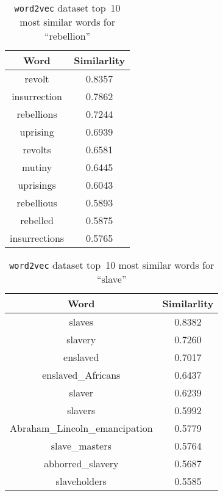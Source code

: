 \begin{table}[h]
  \centering
  \caption{\texttt{word2vec} dataset top~10 most similar words for ``rebellion''}\label{tab:P03:Word2Vec:Rebellion}
  \begin{tabular}{|c|c|}
    \hline
    \textbf{Word} & \textbf{Similarlity} \\\hline\hline
    revolt        & 0.8357 \\\hline
    insurrection  & 0.7862 \\\hline
    rebellions    & 0.7244 \\\hline
    uprising      & 0.6939 \\\hline
    revolts       & 0.6581 \\\hline
    mutiny        & 0.6445 \\\hline
    uprisings     & 0.6043 \\\hline
    rebellious    & 0.5893 \\\hline
    rebelled      & 0.5875 \\\hline
    insurrections & 0.5765 \\\hline
  \end{tabular}
\end{table}

\begin{table}[h]
  \centering
  \caption{\texttt{word2vec} dataset top~10 most similar words for ``slave''}\label{tab:P03:Word2Vec:Slave}
  \begin{tabular}{|c|c|}
    \hline
    \textbf{Word} & \textbf{Similarlity} \\\hline\hline
    slaves            & 0.8382 \\\hline
    slavery           & 0.7260 \\\hline
    enslaved          & 0.7017 \\\hline
    enslaved\_Africans  & 0.6437 \\\hline
    slaver            & 0.6239 \\\hline
    slavers           & 0.5992 \\\hline
    Abraham\_Lincoln\_emancipation & 0.5779 \\\hline
    slave\_masters    & 0.5764 \\\hline
    abhorred\_slavery & 0.5687 \\\hline
    slaveholders      & 0.5585 \\\hline
  \end{tabular}
\end{table}
